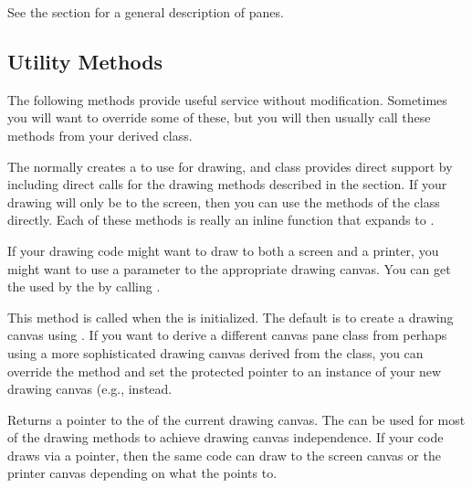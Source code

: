 See the section  for a general description of panes.

\subsection* {Utility Methods}

The following methods provide useful service without modification. Sometimes
you will want to override some of these, but you will then usually
call these methods from your derived class.


The  normally creates a  to
use for drawing, and class provides direct support by including
direct calls for the drawing methods described in the 
section. If your drawing will only be to the screen, then you
can use the methods of the  class directly.
Each of these methods is really an inline function that expands
to .

If your drawing code might want to draw to both a screen and
a printer, you might want to use a parameter to the appropriate
drawing canvas. You can get the  used by the 
by calling .


This method is called when the  is initialized.
The default is to create a drawing canvas using . If you want to derive a different canvas
pane class from  perhaps using a more
sophisticated drawing canvas derived from the 
class, you can override the  method and set the
protected  pointer to an instance of your new
drawing canvas (e.g., 
instead.


Returns a pointer to the  of the current drawing canvas. The
 can be used for most of the drawing methods to achieve
drawing canvas independence. If your code draws via a  pointer,
then the same code can draw to the screen canvas or the printer canvas
depending on what the  points to.

